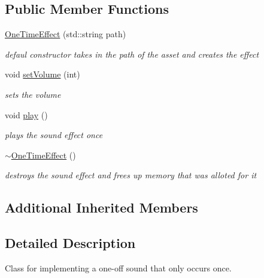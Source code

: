 \subsection*{Public Member Functions}
\begin{DoxyCompactItemize}
\item 
\hypertarget{class_one_time_effect_a7bf3cfe013122b1bd31874ead2d197ff}{}\label{class_one_time_effect_a7bf3cfe013122b1bd31874ead2d197ff} 
\hyperlink{class_one_time_effect_a7bf3cfe013122b1bd31874ead2d197ff}{One\+Time\+Effect} (std\+::string path)
\begin{DoxyCompactList}\small\item\em defaul constructor takes in the path of the asset and creates the effect \end{DoxyCompactList}\item 
\hypertarget{class_one_time_effect_a8e07ddcd58c93a55d78048ae259294a2}{}\label{class_one_time_effect_a8e07ddcd58c93a55d78048ae259294a2} 
void \hyperlink{class_one_time_effect_a8e07ddcd58c93a55d78048ae259294a2}{set\+Volume} (int)
\begin{DoxyCompactList}\small\item\em sets the volume \end{DoxyCompactList}\item 
\hypertarget{class_one_time_effect_ad1590a042b10d009f76c272916a1ea79}{}\label{class_one_time_effect_ad1590a042b10d009f76c272916a1ea79} 
void \hyperlink{class_one_time_effect_ad1590a042b10d009f76c272916a1ea79}{play} ()
\begin{DoxyCompactList}\small\item\em plays the sound effect once \end{DoxyCompactList}\item 
\hypertarget{class_one_time_effect_a2807b3dfe06cf22d365f64c360291b6e}{}\label{class_one_time_effect_a2807b3dfe06cf22d365f64c360291b6e} 
\hyperlink{class_one_time_effect_a2807b3dfe06cf22d365f64c360291b6e}{$\sim$\+One\+Time\+Effect} ()
\begin{DoxyCompactList}\small\item\em destroys the sound effect and frees up memory that was alloted for it \end{DoxyCompactList}\end{DoxyCompactItemize}
\subsection*{Additional Inherited Members}


\subsection{Detailed Description}
Class for implementing a one-\/off sound that only occurs once. 

